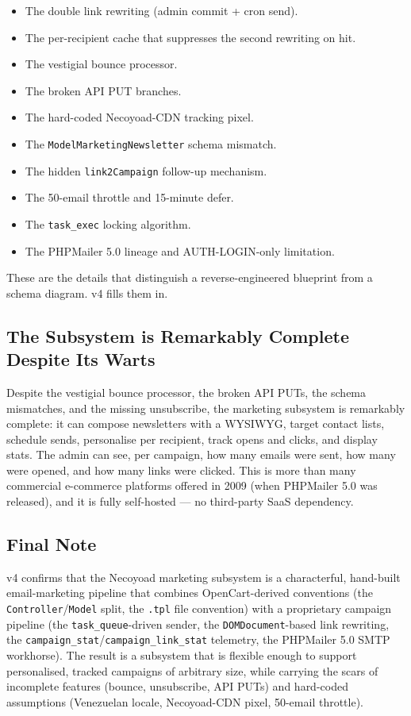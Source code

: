 \documentclass[11pt,a4paper]{article}
\begin{document}
\begin{itemize}[leftmargin=1.6em,itemsep=2pt]
  \item The double link rewriting (admin commit + cron send).
  \item The per-recipient cache that suppresses the second
        rewriting on hit.
  \item The vestigial bounce processor.
  \item The broken API PUT branches.
  \item The hard-coded Necoyoad-CDN tracking pixel.
  \item The \texttt{ModelMarketingNewsletter} schema mismatch.
  \item The hidden \texttt{link2Campaign} follow-up mechanism.
  \item The 50-email throttle and 15-minute defer.
  \item The \texttt{task\_exec} locking algorithm.
  \item The PHPMailer 5.0 lineage and AUTH-LOGIN-only limitation.
\end{itemize}

These are the details that distinguish a reverse-engineered
blueprint from a schema diagram. v4 fills them in.

\subsection{The Subsystem is Remarkably Complete Despite Its Warts}

Despite the vestigial bounce processor, the broken API PUTs, the
schema mismatches, and the missing unsubscribe, the marketing
subsystem is remarkably complete: it can compose newsletters with
a WYSIWYG, target contact lists, schedule sends, personalise per
recipient, track opens and clicks, and display stats. The admin
can see, per campaign, how many emails were sent, how many were
opened, and how many links were clicked. This is more than many
commercial e-commerce platforms offered in 2009 (when PHPMailer
5.0 was released), and it is fully self-hosted --- no
third-party SaaS dependency.

\subsection{Final Note}

v4 confirms that the Necoyoad marketing subsystem is a
characterful, hand-built email-marketing pipeline that combines
OpenCart-derived conventions (the
\texttt{Controller}/\texttt{Model} split, the
\texttt{.tpl} file convention) with a proprietary campaign
pipeline (the \texttt{task\_queue}-driven sender, the
\texttt{DOMDocument}-based link rewriting, the
\texttt{campaign\_stat}/\texttt{campaign\_link\_stat} telemetry,
the PHPMailer 5.0 SMTP workhorse). The result is a subsystem
that is flexible enough to support personalised, tracked
campaigns of arbitrary size, while carrying the scars of
incomplete features (bounce, unsubscribe, API PUTs) and
hard-coded assumptions (Venezuelan locale, Necoyoad-CDN pixel,
50-email throttle).
\end{document}
